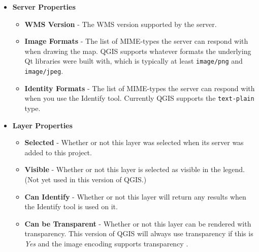 \begin{itemize}[label=--]
\item \textbf{Server Properties}

\begin{itemize}[label=--]
\item \textbf{WMS Version}      - The WMS version supported by the server.

\item \textbf{Image Formats}    - The list of MIME-types the server can respond with when
                                  drawing the map.  QGIS supports whatever formats
                                  the underlying Qt libraries were built with, which
                                  is typically at least \texttt{image/png}
                                  and \texttt{image/jpeg}.

\item \textbf{Identity Formats} - The list of MIME-types the server can respond with when
                                  you use the Identify tool.  Currently QGIS supports
                                  the \texttt{text-plain} type.

\end{itemize}

\item \textbf{Layer Properties}

\begin{itemize}[label=--]
\item \textbf{Selected}         - Whether or not this layer was selected when its                                                                        server was added to this project.

\item \textbf{Visible}          - Whether or not this layer is selected as visible
                                  in the legend.  (Not yet used in this version of QGIS.)

\item \textbf{Can Identify}     - Whether or not this layer will return any results
                                  when the Identify tool is used on it.

\item \textbf{Can be Transparent} - Whether or not this layer can be rendered with transparency.
                                    This version of
                                    QGIS will always use transparency if this is \textsl{Yes}
                                    and the image encoding supports transparency
                                    .


\end{itemize}
\end{itemize}
